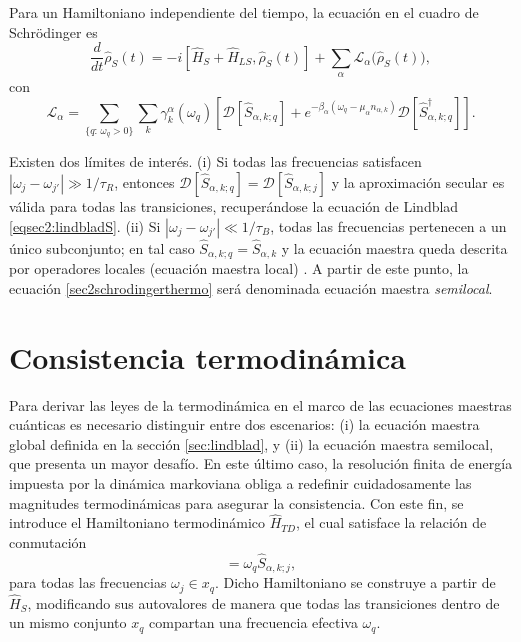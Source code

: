Para un Hamiltoniano independiente del tiempo, la ecuación en el cuadro de Schrödinger es
\begin{equation}
    \frac{d}{dt}\hat{\rho}_{S}(t) 
    = -i [\hat{H}_{S}+ \hat{H}_{LS},\hat{\rho}_{S}(t)]
      + \sum_{\alpha}\mathcal{L}_{\alpha}\big(\hat{\rho}_{S}(t)\big),
    \label{sec2schrodingerthermo}
\end{equation}
con
\begin{equation}
    \mathcal{L}_{\alpha} 
    = \sum_{\{q:\,\omega_{q}>0\}} \sum_{k}\gamma^{\alpha}_{k}(\omega_{q})
      \left[
        \mathcal{D}[\hat{S}_{\alpha,k;q}]
        + e^{-\beta_{\alpha}(\omega_{q}-\mu_{\alpha}n_{\alpha,k})}
          \mathcal{D}[\hat{S}^{\dagger}_{\alpha,k;q}]
      \right].
    \label{sec2lindbladconsistency}
\end{equation}

Existen dos límites de interés. (i) Si todas las frecuencias satisfacen 
\(|\omega_{j}-\omega_{j'}|\gg 1/\tau_{R}\),
entonces \(\mathcal{D}[\hat{S}_{\alpha,k;q}]=\mathcal{D}[\hat{S}_{\alpha,k;j}]\) y la aproximación secular es válida para todas las transiciones, recuperándose la ecuación de Lindblad \ref{eqsec2:lindbladS}. (ii) Si 
\(|\omega_{j}-\omega_{j'}|\ll 1/\tau_{B}\),
todas las frecuencias pertenecen a un único subconjunto; en tal caso \(\hat{S}_{\alpha,k;q}=\hat{S}_{\alpha,k}\) y la ecuación maestra queda descrita por operadores locales (ecuación maestra local) \cite{wichterich2007modeling}. A partir de este punto, la ecuación \eqref{sec2schrodingerthermo} será denominada ecuación maestra \textit{semilocal}.



\section{Consistencia termodinámica}
\label{sec2:thermolaws}

Para derivar las leyes de la termodinámica en el marco de las ecuaciones maestras cuánticas es necesario distinguir entre dos escenarios: 
(i) la ecuación maestra global definida en la sección \ref{sec:lindblad}, y 
(ii) la ecuación maestra semilocal, que presenta un mayor desafío. 
En este último caso, la resolución finita de energía impuesta por la dinámica markoviana obliga a redefinir cuidadosamente las magnitudes termodinámicas para asegurar la consistencia. 
Con este fin, se introduce el Hamiltoniano termodinámico $\hat{H}_{TD}$, el cual satisface la relación de conmutación
\begin{equation*}
    [\hat{S}_{\alpha,k;j},\hat{H}_{TD}] = \omega_{q}\hat{S}_{\alpha,k;j},
\end{equation*}
para todas las frecuencias $\omega_{j} \in x_{q}$. 
Dicho Hamiltoniano se construye a partir de $\hat{H}_{S}$, modificando sus autovalores de manera que todas las transiciones dentro de un mismo conjunto $x_q$ compartan una frecuencia efectiva $\omega_{q}$.

